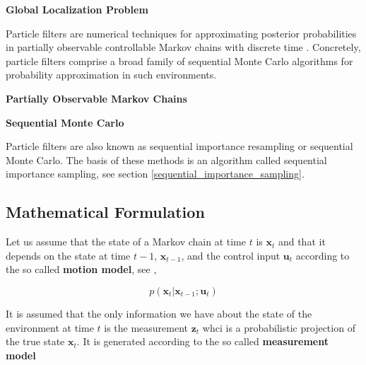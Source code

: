 \begin{framed}
\begin{remark}{\textbf{Global Localization  Problem}}
\end{remark}
\end{framed}
 
Particle filters are numerical techniques for approximating posterior probabilities in partially observable controllable Markov 
chains with discrete time \cite{Thurn2002}. Concretely, particle filters comprise a broad family of sequential Monte Carlo algorithms
for probability approximation in such environments.

\begin{framed}
\begin{remark}{\textbf{Partially Observable Markov Chains}}
\end{remark}
\end{framed}

\begin{framed}
\begin{remark}{\textbf{Sequential Monte Carlo}}

Particle filters are also known as sequential importance resampling or sequential Monte Carlo.
The basis of these methods is an algorithm called  sequential importance sampling, see section \ref{sequential_importance_sampling}. 
\end{remark}
\end{framed}

\subsection{Mathematical Formulation}
\label{pf_mathematical_formulation}

Let us assume that the state of a Markov chain at time $t$ is $\mathbf{x}_t$ and that it depends on the
state at time $t-1$, $\mathbf{x}_{t-1}$, and the control input $\mathbf{u}_t$ according to the so called \textbf{motion model}, see \cite{Thurn2002}, 

\begin{equation}
p(\mathbf{x}_t | \mathbf{x}_{t-1}; \mathbf{u}_{t}) 
\label{pf_motion_model}
\end{equation}

It is assumed that the only information we have about the state of the environment at time $t$ is the measurement $\mathbf{z}_t$
whci is a probabilistic projection of the true state $\mathbf{x}_t$. It is generated according to the so called \textbf{measurement model}

